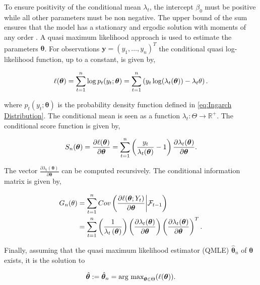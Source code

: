 To ensure positivity of the conditional mean $\lambda_t$, the intercept $\beta_0$ must be positive while all other parameters must be non negative. The upper bound of the sum ensures that the model has a stationary and ergodic solution with moments of any order \cite{Ferland:2006,Fokianos:2009,Doukhan:2012}. A quasi maximum likelihood approach is used to estimate the parameters $\bm{\theta}$. 
For observations $\textbf{y} = \left(y_1,\ldots,y_n\right)^T$ the conditional quasi log-likelihood function, up to a constant, is given by,

\begin{equation}
\ell(\bm{\theta}) = \sum_{t=1}^n\log p_t(y_t;\bm{\theta}) = \sum_{t=1}^n \left(y_t\log(\lambda_t(\bm{\theta})) - \lambda_t{\theta}\right).
\label{eq: Quasi log likelihood}
\end{equation}

where $p_t(y_t;\bm{\theta})$ is the probability density function defined in \ref{eq:Ingarch Distribution}. The conditional mean is seen as a function $\lambda_t: \Theta \rightarrow \mathbb{R}^{+}$. The conditional score function is given by,

\begin{equation}
S_n(\bm{\theta}) = \frac{\partial \ell(\bm{\theta})}{\partial \bm{\theta}} = \sum_{t=1}^n\left(\frac{y_t}{\lambda_t(\bm{\theta})}-1\right)\frac{\partial\lambda_t(\bm{\theta})}{\partial \bm{\theta}}.
\label{eq:conditional score}
\end{equation}

The vector $\frac{\partial\lambda_t(\bm{\theta})}{\partial \bm{\theta}}$ can be computed recursively. 
The conditional information matrix is given by, 

\begin{align*}
G_n(\theta) &= \sum_{t=1}^n Cov\left(\frac{\partial \ell(\bm{\theta}; Y_t)}{\partial \bm{\theta}} \middle| \mathcal{F}_{t-1}\right) \\
&=  \sum_{t=1}^n \left(\frac{1}{\lambda_t\left(\bm{\theta}\right)}\right) \left(\frac{\partial \lambda_t(\bm{\theta})}{\partial \bm{\theta}}\right)\left(\frac{\partial \lambda_t(\bm{\theta})}{\partial \bm{\theta}}\right)^T.
\label{eq:conditional information matrix}
\end{align*}

Finally, assuming that the quasi maximum likelihood estimator (QMLE) $\hat{\bm{\theta}}_n$ of $\bm{\theta}$ exists, it is the solution to 

\begin{equation}
\hat{\bm{\theta}}:= \hat{\bm{\theta}}_n = \text{arg max}_{\bm{\theta} \in \Theta} (\ell(\bm{\theta})). 
\label{eq:ingarch qmle}
\end{equation}
